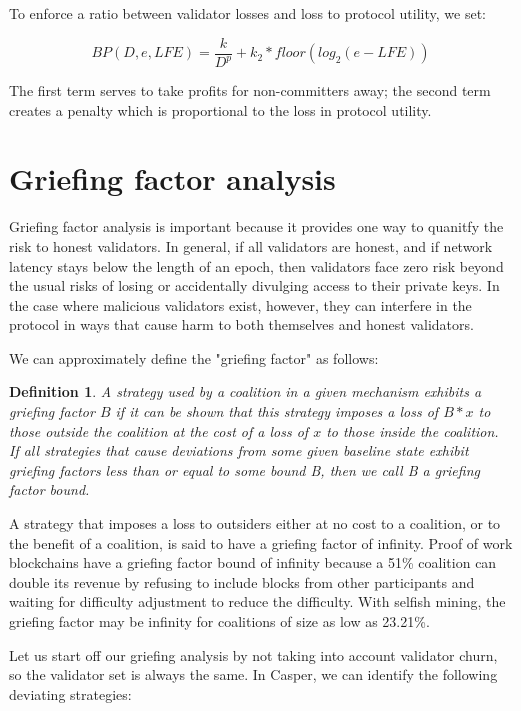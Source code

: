 \documentclass[12pt]{article}
\newtheorem{definition}{Definition}
\begin{document}
To enforce a ratio between validator losses and loss to protocol utility, we set:

$$BP(D, e, LFE) = \frac{k}{D^p} + k_2 * floor(log_2(e - LFE))$$

The first term serves to take profits for non-committers away; the second term creates a penalty which is proportional to the loss in protocol utility.

\section{Griefing factor analysis}

Griefing factor analysis is important because it provides one way to quanitfy the risk to honest validators. In general, if all validators are honest, and if network latency stays below the length of an epoch, then validators face zero risk beyond the usual risks of losing or accidentally divulging access to their private keys. In the case where malicious validators exist, however, they can interfere in the protocol in ways that cause harm to both themselves and honest validators.

We can approximately define the "griefing factor" as follows:

\begin{definition}
A strategy used by a coalition in a given mechanism exhibits a \textit{griefing factor} $B$ if it can be shown that this strategy imposes a loss of $B * x$ to those outside the coalition at the cost of a loss of $x$ to those inside the coalition. If all strategies that cause deviations from some given baseline state exhibit griefing factors less than or equal to some bound B, then we call B a \textit{griefing factor bound}.
\end{definition}

A strategy that imposes a loss to outsiders either at no cost to a coalition, or to the benefit of a coalition, is said to have a griefing factor of infinity. Proof of work blockchains have a griefing factor bound of infinity because a 51\% coalition can double its revenue by refusing to include blocks from other participants and waiting for difficulty adjustment to reduce the difficulty. With selfish mining, the griefing factor may be infinity for coalitions of size as low as 23.21\%.

Let us start off our griefing analysis by not taking into account validator churn, so the validator set is always the same. In Casper, we can identify the following deviating strategies:
\end{document}

